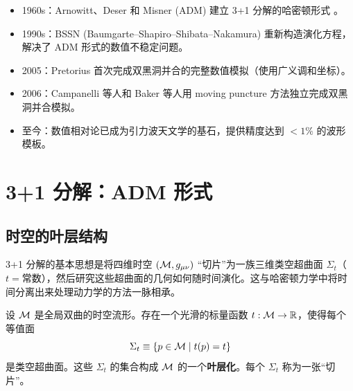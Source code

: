 \begin{note}[数值相对论的历史里程碑]
    \begin{itemize}
        \item 1960s：Arnowitt、Deser 和 Misner (ADM) 建立 3+1 分解的哈密顿形式 \cite{Wald1984}。
        \item 1990s：BSSN (Baumgarte--Shapiro--Shibata--Nakamura) 重新构造演化方程，解决了 ADM 形式的数值不稳定问题。
        \item 2005：Pretorius 首次完成双黑洞并合的完整数值模拟（使用广义调和坐标）。
        \item 2006：Campanelli 等人和 Baker 等人用 moving puncture 方法独立完成双黑洞并合模拟。
        \item 至今：数值相对论已成为引力波天文学的基石，提供精度达到 $<1\%$ 的波形模板。
    \end{itemize}
\end{note}

\section{3+1 分解：ADM 形式}
\label{sec:3plus1_ADM}

\subsection{时空的叶层结构}

3+1 分解的基本思想是将四维时空 $(\mathcal{M}, g_{\mu\nu})$ “切片”为一族三维类空超曲面 $\Sigma_t$（$t = \text{常数}$），然后研究这些超曲面的几何如何随时间演化。这与哈密顿力学中将时间分离出来处理动力学的方法一脉相承。

\begin{definition}
设 $\mathcal{M}$ 是全局双曲的时空流形。存在一个光滑的标量函数 $t: \mathcal{M} \to \mathbb{R}$，使得每个等值面
\begin{equation}
    \Sigma_t \equiv \{ p \in \mathcal{M} \mid t(p) = t \}
\end{equation}
是类空超曲面。这些 $\Sigma_t$ 的集合构成 $\mathcal{M}$ 的一个\textbf{叶层化}。每个 $\Sigma_t$ 称为一张“切片”。
\label{def:foliation}
\end{definition}

